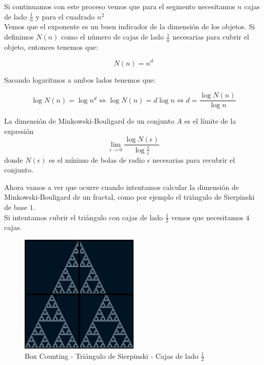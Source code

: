 \noindent Si continuamos con este proceso vemos que para el segmento necesitamos $n$ cajas de lado $\frac{1}{n}$ y para el cuadrado $n^2$\\

\noindent Vemos que el exponente es un buen indicador de la dimensión de los objetos. Si definimos $N(n)$ como el número de cajas de lado $\frac{1}{n}$ necesarias para cubrir el objeto, entonces tenemos que:

\begin{equation}
    N(n) = n^d
\end{equation}

\noindent Sacando logaritmos a ambos lados tenemos que:

\begin{equation}
    \log N(n) = \log n^d \Longleftrightarrow \log N(n) = d \log n \Longleftrightarrow d = \frac{\log N(n)}{\log n}
\end{equation}

\begin{definition}
    La dimensión de Minkowski-Bouligard de un conjunto $A$ es el límite de la expresión
    \begin{equation}
        \lim_{\epsilon \to 0} \frac{\log N(\epsilon)}{\log \frac{1}{\epsilon}}
    \end{equation}
    donde $N(\epsilon)$ es el mínimo de bolas de radio $\epsilon$ necesarias para recubrir el conjunto.
\end{definition}

\noindent Ahora vamos a ver que ocurre cuando intentamos calcular la dimensión de Minkowski-Bouligard de un fractal, como por ejemplo el triángulo de Sierpinski de base $1$.\\

\noindent Si intentamos cubrir el triángulo con cajas de lado $\frac{1}{2}$ vemos que necesitamos $4$ cajas.

\begin{figure}[H]
    \centering
    \includegraphics[width=0.5\textwidth]{figures/boxcounting-sierspinsky-1.png}
    \caption{Box Counting - Triángulo de Sierpinski - Cajas de lado $\frac{1}{2}$}
\end{figure}

